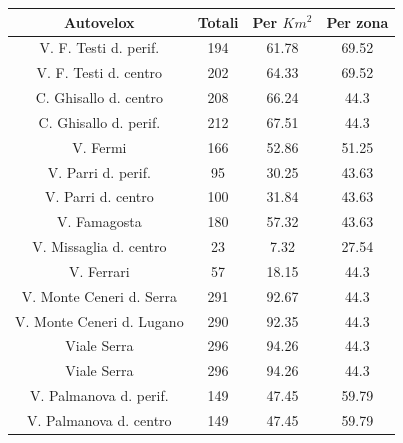 \documentclass[a4paper,12pt]{report}
\begin{document}
\begin{center}
    \def\arraystretch{1.5}%
    \begin{tabular}{ |c|c|c|c| }
        \hline
        Autovelox & Totali & Per $Km^2$ & Per zona \\ 
        \hline
        \rowcolor{TableGray}
        V. F. Testi d. perif.\footnotemark[1]   &   194 &   61.78   &   69.52 \\
        V. F. Testi d. centro                   &   202 &   64.33   &   69.52 \\
        \rowcolor{TableGray}
        C. Ghisallo d. centro\footnotemark[2]   &   208 &   66.24   &   44.3 \\
        C. Ghisallo d. perif.                   &   212 &   67.51   &   44.3 \\
        \rowcolor{TableGray}
        V. Fermi                                &   166 &   52.86   &   51.25 \\
        V. Parri d. perif.                      &    95 &   30.25   &   43.63 \\
        \rowcolor{TableGray}
        V. Parri d. centro                      &   100 &   31.84   &   43.63 \\
        V. Famagosta                            &   180 &   57.32   &   43.63 \\
        \rowcolor{TableGray}
        V. Missaglia d. centro                  &   23  &    7.32   &   27.54 \\
        V. Ferrari                              &   57  &   18.15   &   44.3 \\
        \rowcolor{TableGray}
        V. Monte Ceneri d. Serra                 &   291 &   92.67   &   44.3 \\
        V. Monte Ceneri d. Lugano                &   290 &   92.35   &   44.3 \\
        \rowcolor{TableGray}
        Viale Serra                             &   296 &   94.26   &   44.3 \\
        Viale Serra                             &   296 &   94.26   &   44.3 \\
        \rowcolor{TableGray}
        V. Palmanova d. perif.                  &   149 &   47.45   &   59.79 \\
        V. Palmanova d. centro                  &   149 &   47.45   &   59.79 \\
        \hline
    \end{tabular}
\end{center}
\end{document}
